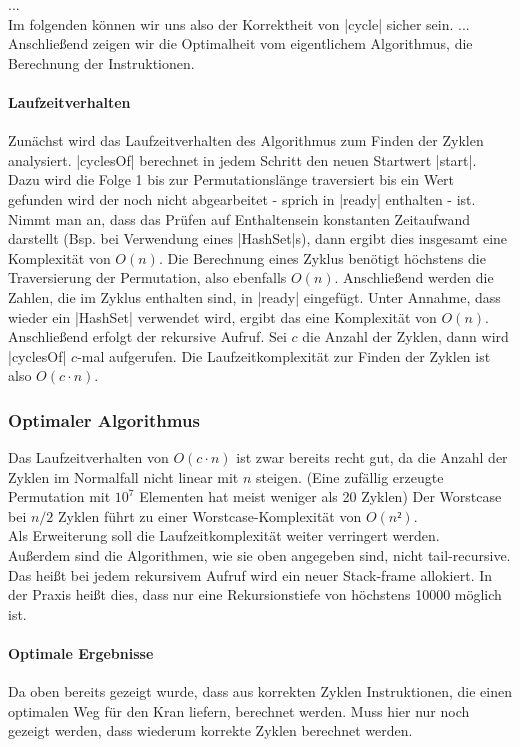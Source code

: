 ... \\
Im folgenden können wir uns also der Korrektheit von |cycle| sicher sein. 
... \\
Anschließend zeigen wir die Optimalheit vom eigentlichem Algorithmus, die Berechnung der Instruktionen.

\paragraph{Laufzeitverhalten}
Zunächst wird das Laufzeitverhalten des Algorithmus zum Finden der Zyklen analysiert.
|cyclesOf| berechnet in jedem Schritt den neuen Startwert |start|.
Dazu wird die Folge 1 bis zur Permutationslänge traversiert bis ein Wert gefunden wird der noch nicht abgearbeitet - sprich in |ready| enthalten - ist.
Nimmt man an, dass das Prüfen auf Enthaltensein konstanten Zeitaufwand darstellt (Bsp. bei Verwendung eines |HashSet|s), dann ergibt dies insgesamt eine Komplexität von $O(n)$.
Die Berechnung eines Zyklus benötigt höchstens die Traversierung der Permutation, also ebenfalls $O(n)$. %
Anschließend werden die Zahlen, die im Zyklus enthalten sind, in |ready| eingefügt. Unter Annahme, dass wieder ein |HashSet| verwendet wird, ergibt das eine Komplexität von $O(n)$.
Anschließend erfolgt der rekursive Aufruf. Sei $c$ die Anzahl der Zyklen, dann wird |cyclesOf| $c$-mal aufgerufen.
Die Laufzeitkomplexität zur Finden der Zyklen ist also $O(c \cdot n)$. \\

\subsubsection{Optimaler Algorithmus} %
Das Laufzeitverhalten von $O(c \cdot n)$ ist zwar bereits recht gut, da die Anzahl der Zyklen im Normalfall nicht linear mit $n$ steigen.
(Eine zufällig erzeugte Permutation mit $10^7$ Elementen hat meist weniger als 20 Zyklen)%
Der Worstcase bei $n/2$ Zyklen führt zu einer Worstcase-Komplexität von $O(n²)$. \\
Als Erweiterung soll die Laufzeitkomplexität weiter verringert werden. \\
Außerdem sind die Algorithmen, wie sie oben angegeben sind, nicht tail-recursive.
Das heißt bei jedem rekursivem Aufruf wird ein neuer Stack-frame allokiert.
In der Praxis heißt dies, dass nur eine Rekursionstiefe von höchstens 10000 möglich ist.

\paragraph{Optimale Ergebnisse}
Da oben %
bereits gezeigt wurde, dass aus korrekten Zyklen Instruktionen, die einen optimalen Weg für den Kran liefern, berechnet werden.
Muss hier nur noch gezeigt werden, dass wiederum korrekte Zyklen berechnet werden. \\

